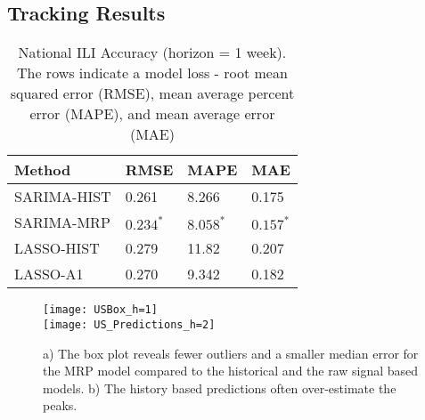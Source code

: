 \documentclass[fleqn,10pt]{wlscirep}
\begin{document}
\subsection*{Tracking Results}

\begin{table}[tbp]
\centering
\begin{tabular}{|l|l|l|l|}
\hline
Method        & RMSE  & MAPE  & MAE \\ \hline
SARIMA-HIST       & 0.261 & 8.266 &  0.175 \\ \hline
SARIMA-MRP  & $\mathbf{0.234^*}$ & $\mathbf{8.058^*}$ & $\mathbf{0.157^*}$\\ \hline
LASSO-HIST & 0.279 & 11.82 & 0.207 \\ \hline
LASSO-A1      & 0.270 & 9.342 & 0.182 \\ \hline
\end{tabular}
\caption{National ILI Accuracy (horizon = 1 week). The rows indicate a model loss - root mean squared error (RMSE), mean average percent error (MAPE), and mean average error (MAE)}
\label{table:mse-national}
\end{table}

 \begin{figure}%
 \centering
 \texttt{[image: USBox\_h=1]}\\
 \texttt{[image: US\_Predictions\_h=2]}
 \caption{a) The box plot reveals fewer outliers and a smaller median error for the MRP model compared to the historical and the raw signal based models. b) The history based predictions often over-estimate the peaks.}
  \label{fig:US_Box}
 \end{figure}



\end{document}
